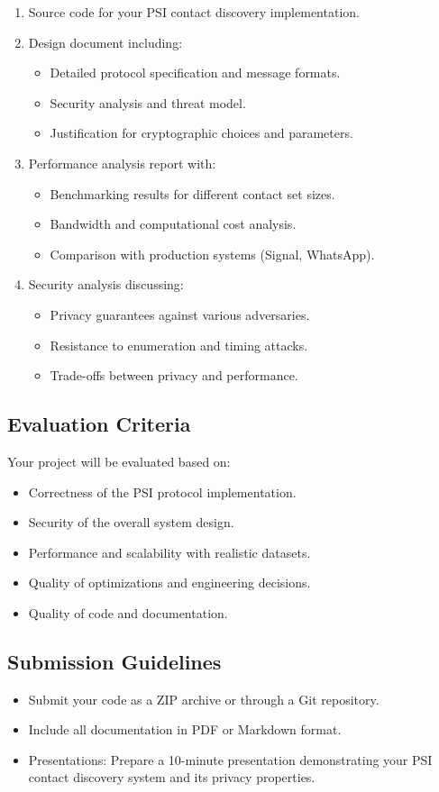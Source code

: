 \documentclass[10pt,a4paper,american]{exam}
\begin{document}
\begin{enumerate}
	\item Source code for your PSI contact discovery implementation.
	\item Design document including:
	      \begin{itemize}
		      \item Detailed protocol specification and message formats.
		      \item Security analysis and threat model.
		      \item Justification for cryptographic choices and parameters.
	      \end{itemize}
	\item Performance analysis report with:
	      \begin{itemize}
		      \item Benchmarking results for different contact set sizes.
		      \item Bandwidth and computational cost analysis.
		      \item Comparison with production systems (Signal, WhatsApp).
	      \end{itemize}
	\item Security analysis discussing:
	      \begin{itemize}
		      \item Privacy guarantees against various adversaries.
		      \item Resistance to enumeration and timing attacks.
		      \item Trade-offs between privacy and performance.
	      \end{itemize}
\end{enumerate}

\subsection*{Evaluation Criteria}
Your project will be evaluated based on:

\begin{itemize}
	\item Correctness of the PSI protocol implementation.
	\item Security of the overall system design.
	\item Performance and scalability with realistic datasets.
	\item Quality of optimizations and engineering decisions.
	\item Quality of code and documentation.
\end{itemize}

\subsection*{Submission Guidelines}
\begin{itemize}
	\item Submit your code as a ZIP archive or through a Git repository.
	\item Include all documentation in PDF or Markdown format.
	\item Presentations: Prepare a 10-minute presentation demonstrating your PSI contact discovery system and its privacy properties.
\end{itemize}
\end{document}
